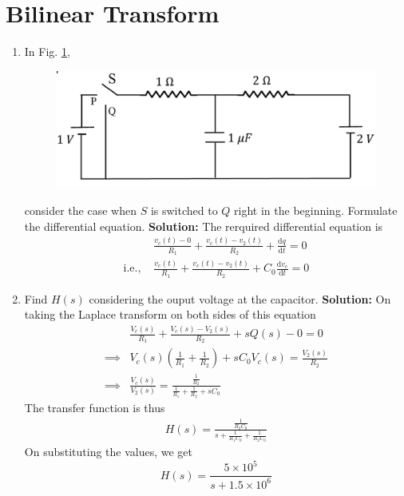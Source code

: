\documentclass[journal,12pt,twocolumn]{IEEEtran}
\newcommand{\solution}{\noindent \textbf{Solution: }}
\providecommand{\brak}[1]{\ensuremath{\left(#1\right)}}
\providecommand{\der}[1]{\mathrm{d} #1}
\numberwithin{equation}{section}
\renewcommand\thesection{\arabic{section}}
\begin{document}
\section{Bilinear Transform}
\begin{enumerate}[label=\arabic*.,ref=\thesection.\theenumi]
\item In Fig. 
	\ref{fig:ckt},
	\begin{figure}[!ht]
		\centering
		\includegraphics[width=\columnwidth]{figs/ckt.jpg}
		\caption{}
		\label{fig:ckt}
	\end{figure}
	consider the case when $S$ is switched to $Q$ right in the beginning. Formulate the differential equation.
	\solution The rerquired differential equation is
	\begin{align}
		&\frac{v_c(t) - 0}{R_1} + \frac{v_c(t) - v_2(t)}{R_2} + \frac{\der{q}}{\der{t}} = 0 \\
		\text{i.e., } &\frac{v_c(t)}{R_1} + \frac{v_c(t) - v_2(t)}{R_2} + C_0\frac{\der{v_c}}{\der{t}} = 0
	\end{align}
\item Find $H(s)$ considering the ouput voltage at the capacitor.
		\solution On taking the Laplace transform on both sides of this equation
		\begin{align}
			&\frac{V_c(s)}{R_1} + \frac{V_c(s) - V_2(s)}{R_2} + sQ(s) - 0 = 0 \\
			\implies &V_c(s) \brak{\frac{1}{R_1} + \frac{1}{R_2}} + sC_0V_c(s) = \frac{V_2(s)}{R_2} \\
			\implies &\frac{V_c(s)}{V_2(s)} = \frac{\frac{1}{R_2}}{\frac{1}{R_1} + \frac{1}{R_2} + sC_0}
		\end{align}		
		The transfer function is thus
		\begin{align}
			H(s) = \frac{\frac{1}{R_2C_0}}{s + \frac{1}{R_1C_0} + \frac{1}{R_2C_0}}
		\end{align}	
		On substituting the values, we get
		\begin{equation}
			H(s) = \frac{5 \times 10^5}{s + 1.5 \times 10^6}

\end{equation}
\end{enumerate}
\end{document}
